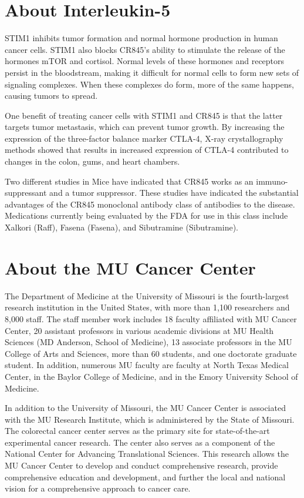 \documentclass{article}
\begin{document}
\section{About Interleukin-5}


STIM1 inhibits tumor formation and normal hormone production in human cancer cells. STIM1 also blocks CR845’s ability to stimulate the release of the hormones mTOR and cortisol. Normal levels of these hormones and receptors persist in the bloodstream, making it difficult for normal cells to form new sets of signaling complexes. When these complexes do form, more of the same happens, causing tumors to spread.

One benefit of treating cancer cells with STIM1 and CR845 is that the latter targets tumor metastasis, which can prevent tumor growth. By increasing the expression of the three-factor balance marker CTLA-4, X-ray crystallography methods showed that results in increased expression of CTLA-4 contributed to changes in the colon, gums, and heart chambers.

Two different studies in Mice have indicated that CR845 works as an immuno-suppressant and a tumor suppressor. These studies have indicated the substantial advantages of the CR845 monoclonal antibody class of antibodies to the disease. Medications currently being evaluated by the FDA for use in this class include Xalkori (Raff), Fasena (Fasena), and Sibutramine (Sibutramine).



\section{About the MU Cancer Center}


The Department of Medicine at the University of Missouri is the fourth-largest research institution in the United States, with more than 1,100 researchers and 8,000 staff. The staff member work includes 18 faculty affiliated with MU Cancer Center, 20 assistant professors in various academic divisions at MU Health Sciences (MD Anderson, School of Medicine), 13 associate professors in the MU College of Arts and Sciences, more than 60 students, and one doctorate graduate student. In addition, numerous MU faculty are faculty at North Texas Medical Center, in the Baylor College of Medicine, and in the Emory University School of Medicine.

In addition to the University of Missouri, the MU Cancer Center is associated with the MU Research Institute, which is administered by the State of Missouri. The colorectal cancer center serves as the primary site for state-of-the-art experimental cancer research. The center also serves as a component of the National Center for Advancing Translational Sciences. This research allows the MU Cancer Center to develop and conduct comprehensive research, provide comprehensive education and development, and further the local and national vision for a comprehensive approach to cancer care.
\end{document}
